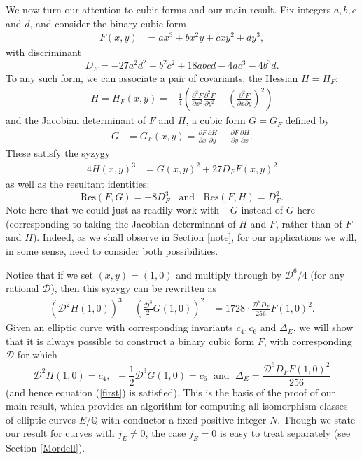 We now turn our attention to cubic forms and our main result. Fix integers $a, b, 
c$ and $d$, and consider the binary cubic form 
\begin{align} \label{form0}
F(x,y)&=ax^3+bx^2y+cxy^2+dy^3,
\end{align}
with discriminant
\begin{equation} \label{claire-bear}
D_F = -27 a^2 d^2 + b^2 c^2 + 18 abcd -4 ac^3 -4 b^3 d.
\end{equation}
To any such form, we can associate a pair of covariants, the Hessian  $H=H_F$:
\begin{align*}
H=  H_F (x,y)=  - \frac{1}{4} \left(\frac{\partial^2 F}{\partial x^2} \frac{\partial^2 F}{\partial y^2} - 
\left(\frac{\partial^2 F}{\partial x \partial y}\right)^2 \right) 
\end{align*}
and the Jacobian determinant of $F$ and $H$,  a cubic form $G=G_F$ defined by
\begin{align*}
G&=G_F (x,y)=\frac{\partial F}{\partial x}\frac{\partial H}{\partial y}-  \frac{\partial F}{\partial y} \frac{\partial 
H}{\partial x}.
\end{align*}
These satisfy the syzygy
\begin{align} \label{syz}
4H(x,y)^3 &= G(x,y)^2+27D_F F(x,y)^2
\end{align}
as well as the resultant identities:
\begin{equation} \label{resultant}
\mbox{Res} (F,G) = -8 D_F^3 \; \; \mbox{ and } \; \; 
 \mbox{Res} (F,H) = D_F^2.
\end{equation}
Note here that we could just as readily work with $-G$ instead of $G$ here (corresponding to taking the Jacobian determinant of $H$ and $F$, rather than of $F$ and $H$). Indeed, as we shall observe in Section \ref{note}, for our applications we will, in some sense, need to consider both possibilities.

Notice that if we set $(x,y)=(1,0)$ and multiply through by $\mathcal{D}^6/4$ (for any rational $\mathcal{D}$), then 
this syzygy can be rewritten as
\begin{align*}
  ( \mathcal{D}^2 H(1,0))^3 - \left( \frac{\mathcal{D}^3}{2} G(1,0) \right)^2 
  &=  1728 \cdot \frac{\mathcal{D}^6 D_F}{256} F(1,0)^2.
\end{align*}
Given an elliptic curve with corresponding invariants $c_4, c_6$ and $\Delta_E$, we will show that it is always possible to construct a binary 
cubic form $F$, with corresponding  $\mathcal{D}$ for which 
$$
\mathcal{D}^2 H(1,0) = c_4, \; \; -\frac{1}{2} \mathcal{D}^3 G(1,0) = c_6 \; \mbox{ and } \; \Delta_E =  \frac{\mathcal{D}^6  D_F F(1,0)^2}{256}
$$
(and hence equation (\ref{first}) is satisfied). This is the basis of the proof of our main result, which provides an algorithm for computing all isomorphism classes of elliptic curves $E/\mathbb{Q}$ with conductor a fixed positive integer $N$. Though we state our result for curves with $j_E \neq 0$, the case $j_E=0$ is easy to treat separately (see Section \ref{Mordell}). 

